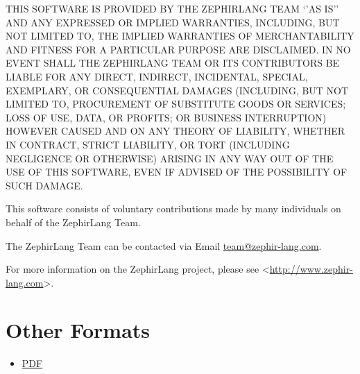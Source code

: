 \documentclass[letterpaper,10pt,english]{sphinxmanual}
\begin{document}
THIS SOFTWARE IS PROVIDED BY THE ZEPHIRLANG TEAM `'AS IS'' AND
ANY EXPRESSED OR IMPLIED WARRANTIES, INCLUDING, BUT NOT LIMITED TO,
THE IMPLIED WARRANTIES OF MERCHANTABILITY AND FITNESS FOR A
PARTICULAR PURPOSE ARE DISCLAIMED.  IN NO EVENT SHALL THE ZEPHIRLANG
TEAM OR ITS CONTRIBUTORS BE LIABLE FOR ANY DIRECT,
INDIRECT, INCIDENTAL, SPECIAL, EXEMPLARY, OR CONSEQUENTIAL DAMAGES
(INCLUDING, BUT NOT LIMITED TO, PROCUREMENT OF SUBSTITUTE GOODS OR
SERVICES; LOSS OF USE, DATA, OR PROFITS; OR BUSINESS INTERRUPTION)
HOWEVER CAUSED AND ON ANY THEORY OF LIABILITY, WHETHER IN CONTRACT,
STRICT LIABILITY, OR TORT (INCLUDING NEGLIGENCE OR OTHERWISE)
ARISING IN ANY WAY OUT OF THE USE OF THIS SOFTWARE, EVEN IF ADVISED
OF THE POSSIBILITY OF SUCH DAMAGE.

This software consists of voluntary contributions made by many
individuals on behalf of the ZephirLang Team.

The ZephirLang Team can be contacted via Email \href{mailto:team@zephir-lang.com}{team@zephir-lang.com}.

For more information on the ZephirLang project,
please see \textless{}\href{http://www.zephir-lang.com}{http://www.zephir-lang.com}\textgreater{}.


\chapter{Other Formats}
\label{index:other-formats}\begin{itemize}
\item {} 
\href{https://github.com/phalcon/zephir-docs/blob/master/en/\_build/latex/ZephirDocumentation.pdf?raw=true}{PDF}

\end{itemize}



\renewcommand{\indexname}{Index}
\printindex
\end{document}
